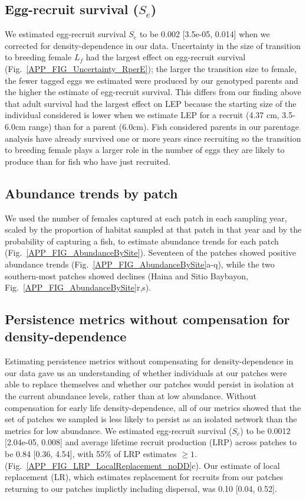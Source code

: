 \documentclass[12pt, oneside]{article}   	%
\begin{document}
\subsection{Egg-recruit survival ($S_e$)} \label{APP_SEC_RESULTS_Egg-recruit_survival}

We estimated egg-recruit survival $S_{e}$ to be 0.002 [3.5e-05, 0.014] when we corrected for density-dependence in our data. Uncertainty in the size of transition to breeding female $L_f$ had the largest effect on egg-recruit survival (Fig.\ \ref{APP_FIG_Uncertainty_RperE}); the larger the transition size to female, the fewer tagged eggs we estimated were produced by our genotyped parents and the higher the estimate of egg-recruit survival. This differs from our finding above that adult survival had the largest effect on LEP because the starting size of the individual considered is lower when we estimate LEP for a recruit (4.37 cm, 3.5-6.0cm range) than for a parent (6.0cm). Fish considered parents in our parentage analysis have already survived one or more years since recruiting so the transition to breeding female plays a larger role in the number of eggs they are likely to produce than for fish who have just recruited. 

\subsection{Abundance trends by patch}

We used the number of females captured at each patch in each sampling year, scaled by the proportion of habitat sampled at that patch in that year and by the probability of capturing a fish, to estimate abundance trends for each patch (Fig.\ \ref{APP_FIG_AbundanceBySite}). Seventeen of the patches showed positive abundance trends (Fig.\ \ref{APP_FIG_AbundanceBySite}a-q), while the two southern-most patches showed declines (Haina and Sitio Baybayon, Fig.\ \ref{APP_FIG_AbundanceBySite}r,s).

\subsection{Persistence metrics without compensation for density-dependence} \label{APP_SEC_RESULTS_noDD} %
Estimating persistence metrics without compensating for density-dependence in our data gave us an understanding of whether individuals at our patches were able to replace themselves and whether our patches would persist in isolation at the current abundance levels, rather than at low abundance. Without compensation for early life density-dependence, all of our metrics showed that the set of patches we sampled is less likely to persist as an isolated network than the metrics for low abundance. We estimated egg-recruit survival ($S_e$) to be 0.0012 [2.04e-05, 0.008] and average lifetime recruit production ($\text{LRP}$) across patches to be 0.84 [0.36, 4.54], with 55\% of LRP estimates $\geq 1$. (Fig.\ \ref{APP_FIG_LRP_LocalReplacement_noDD}c). Our estimate of local replacement (LR), which estimates replacement for recruits from our patches returning to our patches implictly including dispersal, was 0.10 [0.04, 0.52]. 
\end{document}
